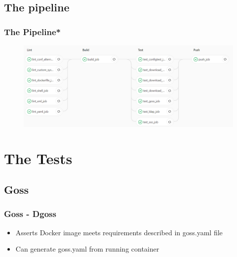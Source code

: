 \documentclass[14pt,aspectratio=169]{beamer}
\begin{document}
{

\subsection{The pipeline}

{
  \begin{frame}
    \frametitle{The Pipeline*}
    \begin{figure}
      \includegraphics[width=\textwidth]{images/pipeline_2.png}
    \end{figure}
  \end{frame}
}

\section{The Tests}

\subsection{Goss}

\begin{frame}[fragile]
  \frametitle{Goss - Dgoss}
  \begin{itemize}
    \item Asserts Docker image meets requirements described in goss.yaml file
    \item Can generate goss.yaml from running container
  \end{itemize}


\end{frame}}
\end{document}
